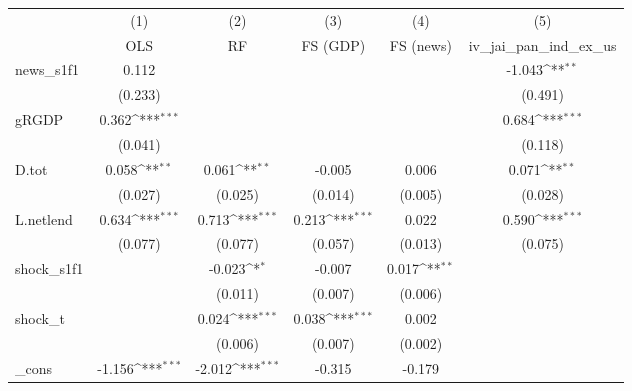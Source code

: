 {
\def\sym#1{\ifmmode^{#1}\else\(^{#1}\)\fi}
\begin{tabular}{l*{5}{c}}
\toprule
            &\multicolumn{1}{c}{(1)}&\multicolumn{1}{c}{(2)}&\multicolumn{1}{c}{(3)}&\multicolumn{1}{c}{(4)}&\multicolumn{1}{c}{(5)}\\
            &\multicolumn{1}{c}{OLS}&\multicolumn{1}{c}{RF}&\multicolumn{1}{c}{FS (GDP)}&\multicolumn{1}{c}{FS (news)}&\multicolumn{1}{c}{iv\_jai\_pan\_ind\_ex\_us}\\
\midrule
news\_s1f1   &       0.112         &                     &                     &                     &      -1.043\sym{**} \\
            &     (0.233)         &                     &                     &                     &     (0.491)         \\
\addlinespace
gRGDP       &       0.362\sym{***}&                     &                     &                     &       0.684\sym{***}\\
            &     (0.041)         &                     &                     &                     &     (0.118)         \\
\addlinespace
D.tot       &       0.058\sym{**} &       0.061\sym{**} &      -0.005         &       0.006         &       0.071\sym{**} \\
            &     (0.027)         &     (0.025)         &     (0.014)         &     (0.005)         &     (0.028)         \\
\addlinespace
L.netlend   &       0.634\sym{***}&       0.713\sym{***}&       0.213\sym{***}&       0.022         &       0.590\sym{***}\\
            &     (0.077)         &     (0.077)         &     (0.057)         &     (0.013)         &     (0.075)         \\
\addlinespace
shock\_s1f1  &                     &      -0.023\sym{*}  &      -0.007         &       0.017\sym{**} &                     \\
            &                     &     (0.011)         &     (0.007)         &     (0.006)         &                     \\
\addlinespace
shock\_t     &                     &       0.024\sym{***}&       0.038\sym{***}&       0.002         &                     \\
            &                     &     (0.006)         &     (0.007)         &     (0.002)         &                     \\
\addlinespace
\_cons      &      -1.156\sym{***}&      -2.012\sym{***}&      -0.315         &      -0.179         &                     \\

\end{tabular}}
